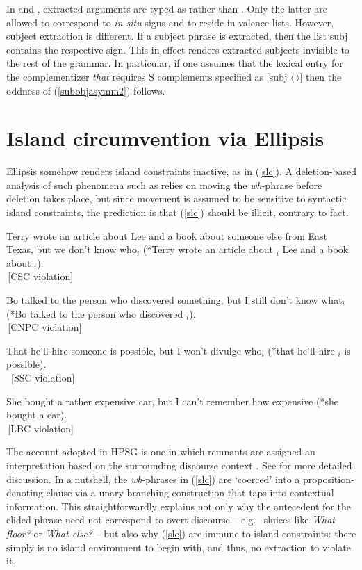 \documentclass[output=paper]{langsci/langscibook}
\begin{document}
\noindent
In \citet{bouma} and \citet{ginzsag}, extracted arguments are typed as  rather than . Only the latter are allowed to correspond to {\it in situ} signs and to reside in valence lists. However, subject extraction is different. If a subject phrase is extracted, then the list {\sc subj} contains the respective  sign. This in effect renders extracted subjects invisible to the rest of the grammar.
In particular, if one assumes that the lexical entry for the complementizer \emph{that} requires 
S complements specified as $[${\sc subj} $\langle \, \rangle]$ then the oddness of 
(\ref{subobjasymm2}) follows.


\section{Island circumvention via Ellipsis}

Ellipsis somehow renders island  constraints inactive, as in (\ref{slc}). A deletion-based analysis of such phenomena such as  \citet{merchantbook}  relies on moving the \emph{wh}-phrase before deletion takes place, but since  movement is assumed to be sensitive to syntactic island constraints, the  prediction is that (\ref{slc}) should be illicit, contrary to fact. 

\ea
\ea Terry wrote an article about Lee and a book about someone else from
East Texas, but we don't know who$_i$ (*Terry wrote an article about \spc$_i$ Lee
and a book about \spc$_i$).\\
 \,[CSC violation]

\ex Bo talked to the person who discovered something, but I still don't know
what$_i$ (*Bo talked to the person who discovered \spc$_i$). \\
\,[CNPC violation]

\ex That he'll hire someone is possible, but I won't divulge who$_i$
(*that he'll  hire \spc$_i$ is possible).\\
\, [SSC violation]

\ex  She bought a rather expensive car, but I can't remember how expensive
(*she bought a \spcs car). \\
\,[LBC violation]
\z \label{slc}
\z

The  account adopted in HPSG is one in which remnants  are assigned an interpretation based on the surrounding discourse context  \citep{ginzsag,Culicover:Jackendoff:05,jacobson08,sagn}. 
See  for more detailed discussion. In a nutshell,  the \emph{wh}-phrases in (\ref{slc}) are `coerced' into a proposition-denoting clause via a unary branching construction that taps into contextual information.  This straightforwardly explains not only why the antecedent for the elided phrase need not correspond to  overt discourse --  e.g. \ sluices like \emph{What floor?} or \emph{What else?} --
but also  why (\ref{slc})  are immune to island constraints: there simply is no island
 environment to begin with, and thus, no extraction to violate it.
\end{document}
